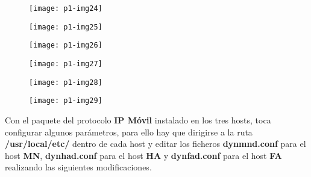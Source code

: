\documentclass[10pt]{article}
\begin{document}
\begin{figure}[H]
	\begin{center}
 		\texttt{[image: p1-img24]}
	\end{center} 
\end{figure}

\begin{figure}[H]
	\begin{center}
 		\texttt{[image: p1-img25]}
	\end{center} 
\end{figure}

\begin{figure}[H]
	\begin{center}
 		\texttt{[image: p1-img26]}
	\end{center} 
\end{figure}

\begin{figure}[H]
	\begin{center}
 		\texttt{[image: p1-img27]}
	\end{center} 
\end{figure}

\begin{figure}[H]
	\begin{center}
 		\texttt{[image: p1-img28]}
	\end{center} 
\end{figure}

\begin{figure}[H]
	\begin{center}
 		\texttt{[image: p1-img29]}
	\end{center} 
\end{figure}

Con el paquete del protocolo \textbf{IP Móvil} instalado en los tres hosts, toca configurar algunos parámetros, para ello hay que dirigirse a la ruta \textbf{/usr/local/etc/} dentro de cada host y editar los ficheros \textbf{dynmnd.conf} para el host \textbf{MN}, \textbf{dynhad.conf} para el host \textbf{HA} y \textbf{dynfad.conf} para el host \textbf{FA} realizando las siguientes modificaciones. \\
\end{document}

